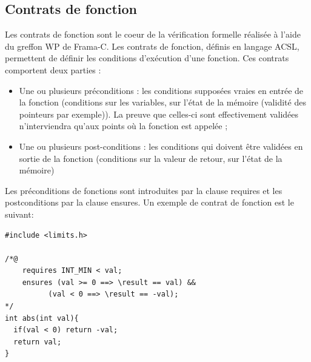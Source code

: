 
\subsection{Contrats de fonction}\label{contrats}

Les contrats de fonction sont le coeur de la vérification formelle réalisée à l'aide du greffon WP de Frama-C. Les contrats de fonction, définis en langage ACSL, permettent de définir les conditions d'exécution d'une fonction. Ces contrats comportent deux parties :

\begin{itemize}
	\item Une ou plusieurs préconditions : les conditions supposées vraies en entrée de la fonction (conditions sur les variables, sur l'état de la mémoire (validité des pointeurs par exemple)). La preuve que celles-ci sont effectivement validées n’interviendra qu’aux points où la fonction est appelée ;
	\item Une ou plusieurs post-conditions : les conditions qui doivent être validées en sortie de la fonction (conditions sur la valeur de retour, sur l'état de la mémoire)
\end{itemize}

\noindent
Les préconditions de fonctions sont introduites par la clause requires et les postconditions par la clause ensures. Un exemple de contrat de fonction est le suivant:

\begin{lstlisting}
#include <limits.h>

/*@
  	requires INT_MIN < val;
  	ensures (val >= 0 ==> \result == val) &&
          (val < 0 ==> \result == -val);
*/
int abs(int val){
  if(val < 0) return -val;
  return val;
}
\end{lstlisting}

